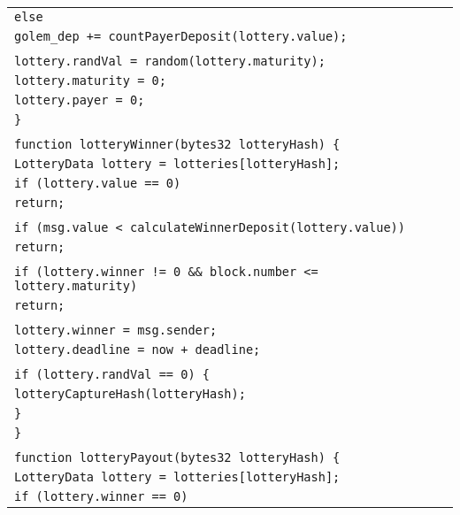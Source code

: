 \documentclass[a4paper]{article}
\begin{document}
\begin{tabularx}{\linewidth}{l}
        \qquad\qquad\texttt{else}\\
        \qquad\qquad\qquad\texttt{golem\_dep += countPayerDeposit(lottery.value);}\\
        \\
        \qquad\qquad\texttt{lottery.randVal = random(lottery.maturity);}\\
        \qquad\qquad\texttt{lottery.maturity = 0;}\\
        \qquad\qquad\texttt{lottery.payer = 0;}\\
        \qquad\texttt{\}}\\
        \\
        \qquad\texttt{function lotteryWinner(bytes32 lotteryHash) \{}\\
        \qquad\qquad\texttt{LotteryData lottery = lotteries[lotteryHash];}\\
        \qquad\qquad\texttt{if (lottery.value == 0)}\\
        \qquad\qquad\qquad\texttt{return;}\\
        \\
        \qquad\qquad\texttt{if (msg.value < calculateWinnerDeposit(lottery.value))}\\
        \qquad\qquad\qquad\texttt{return;}\\
        \\
        \qquad\qquad\texttt{if (lottery.winner != 0 \&\& block.number <= lottery.maturity)}\\
        \qquad\qquad\qquad\texttt{return;}\\
        \\
        \qquad\qquad\texttt{lottery.winner = msg.sender;}\\
        \qquad\qquad\texttt{lottery.deadline = now + deadline;}\\
        \\
        \qquad\qquad\texttt{if (lottery.randVal == 0) \{}\\
        \qquad\qquad\qquad\texttt{lotteryCaptureHash(lotteryHash);}\\
        \qquad\qquad\texttt{\}}\\
        \qquad\texttt{\}}\\
        \\
        \qquad\texttt{function lotteryPayout(bytes32 lotteryHash) \{}\\
        \qquad\qquad\texttt{LotteryData lottery = lotteries[lotteryHash];}\\
        \qquad\qquad\texttt{if (lottery.winner == 0)}\\

\end{tabularx}
\end{document}
